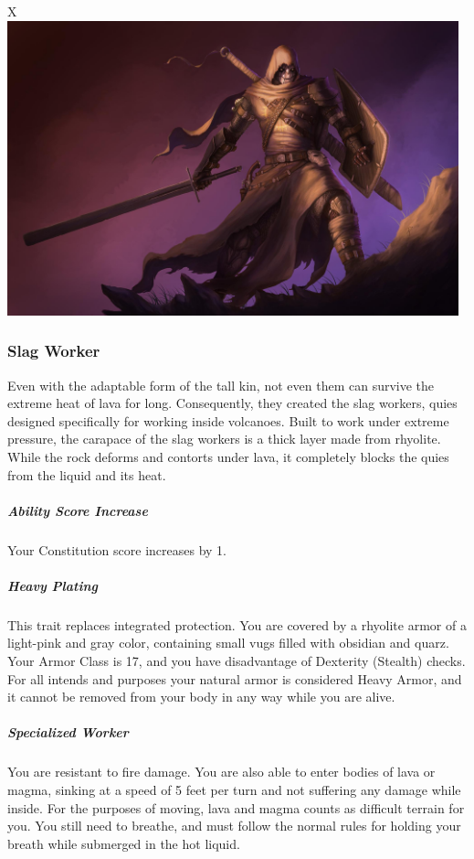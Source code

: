 \begin{table}[b]%
    \begin{DndTable}[width=\linewidth]{X}
        \includegraphics[width=0.98\textwidth]{04kins/img/21quies_executioner.jpg}
    \end{DndTable}
\end{table}

\subsubsection{Slag Worker}
    Even with the adaptable form of the tall kin, not even them can survive the extreme heat of lava for long.
    Consequently, they created the slag workers, quies designed specifically for working inside volcanoes.
    Built to work under extreme pressure, the carapace of the slag workers is a thick layer made from rhyolite.
    While the rock deforms and contorts under lava, it completely blocks the quies from the liquid and its heat.

    \subparagraph{Ability Score Increase} Your Constitution score increases by 1.

    \subparagraph{Heavy Plating} This trait replaces integrated protection.
    You are covered by a rhyolite armor of a light-pink and gray color, containing small vugs filled with obsidian and quarz.
    Your Armor Class is 17, and you have disadvantage of Dexterity (Stealth) checks.
    For all intends and purposes your natural armor is considered Heavy Armor, and it cannot be removed from your body in any way while you are alive.

    \subparagraph{Specialized Worker} You are resistant to fire damage.
    You are also able to enter bodies of lava or magma, sinking at a speed of 5 feet per turn and not suffering any damage while inside.
    For the purposes of moving, lava and magma counts as difficult terrain for you.
    You still need to breathe, and must follow the normal rules for holding your breath while submerged in the hot liquid.


